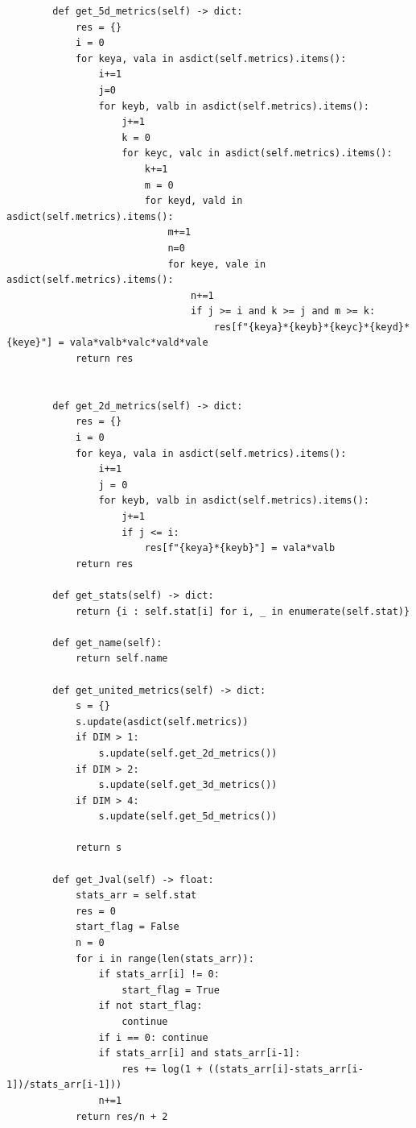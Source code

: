 \documentclass[14pt, a4paper]{extarticle}
\begin{document}
\begin{lstlisting}
        def get_5d_metrics(self) -> dict:
            res = {}
            i = 0
            for keya, vala in asdict(self.metrics).items():
                i+=1
                j=0
                for keyb, valb in asdict(self.metrics).items():
                    j+=1
                    k = 0
                    for keyc, valc in asdict(self.metrics).items():
                        k+=1
                        m = 0
                        for keyd, vald in asdict(self.metrics).items():
                            m+=1
                            n=0
                            for keye, vale in asdict(self.metrics).items():
                                n+=1
                                if j >= i and k >= j and m >= k:
                                    res[f"{keya}*{keyb}*{keyc}*{keyd}*{keye}"] = vala*valb*valc*vald*vale
            return res
        
        
        def get_2d_metrics(self) -> dict:
            res = {}
            i = 0
            for keya, vala in asdict(self.metrics).items():
                i+=1
                j = 0
                for keyb, valb in asdict(self.metrics).items():
                    j+=1
                    if j <= i:
                        res[f"{keya}*{keyb}"] = vala*valb
            return res
        
        def get_stats(self) -> dict:
            return {i : self.stat[i] for i, _ in enumerate(self.stat)}
    
        def get_name(self):
            return self.name
        
        def get_united_metrics(self) -> dict:
            s = {}
            s.update(asdict(self.metrics))
            if DIM > 1:
                s.update(self.get_2d_metrics())
            if DIM > 2:
                s.update(self.get_3d_metrics())
            if DIM > 4:
                s.update(self.get_5d_metrics())
                
            return s
        
        def get_Jval(self) -> float:
            stats_arr = self.stat
            res = 0
            start_flag = False
            n = 0
            for i in range(len(stats_arr)):
                if stats_arr[i] != 0:
                    start_flag = True
                if not start_flag:
                    continue
                if i == 0: continue
                if stats_arr[i] and stats_arr[i-1]:
                    res += log(1 + ((stats_arr[i]-stats_arr[i-1])/stats_arr[i-1]))
                n+=1
            return res/n + 2
    

\end{lstlisting}
\end{document}
